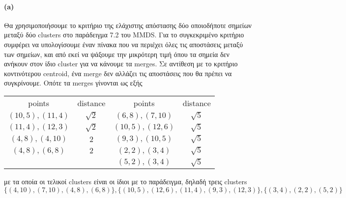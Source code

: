 \documentclass[a4paper,11pt]{article}
\begin{document}
\paragraph{(a)} Θα χρησιμοποιήσουμε το κριτήριο της ελάχιστης απόστασης δύο οποιοδήποτε σημείων μεταξύ δύο clusters στο παράδειγμα 7.2 του MMDS.
Για το συγκεκριμένο κριτήριο συμφέρει να υπολογίσουμε έναν πίνακα που να περιέχει όλες τις αποστάσεις μεταξύ των σημείων, και από εκεί να ψάξουμε την μικρότερη τιμή όπου τα σημεία δεν ανήκουν στον ίδιο cluster για να κάνουμε τα merges.
Σε αντίθεση με το κριτήριο κοντινότερου centroid, ένα merge δεν αλλάζει τις αποστάσεις που θα πρέπει να συγκρίνουμε.
Οπότε τα merges γίνονται ως εξής
\begin{center}
	\begin{tabular}{| c | c || c | c |}
		\hline
		points & distance & points & distance \\ \hhline{|=|=#=|=|}
		$(10,5),(11,4)$ & $\sqrt{2}$ & $(6,8),(7,10)$ & $\sqrt{5}$ \\ \hline
		$(11,4),(12,3)$ & $\sqrt{2}$ & $(10,5),(12,6)$ & $\sqrt{5}$ \\ \hline
		$(4,8),(4,10)$ & $2$ & $(9,3),(10,5)$ & $\sqrt{5}$\\ \hline
		$(4,8),(6,8)$ & $2$ & $(2,2),(3,4)$ & $\sqrt{5}$ \\ \hline
		& & $(5,2),(3,4)$ & $\sqrt{5}$ \\ \hline
	\end{tabular}
\end{center}
με τα οποία οι τελικοί clusters είναι οι ίδιοι με το παράδειγμα, δηλαδή τρεις clusters
\[ \{ (4,10),(7,10),(4,8),(6,8) \}, \{ (10,5),(12,6),(11,4),(9,3),(12,3) \}, \{ (3,4),(2,2),(5,2) \} \]
\end{document}
